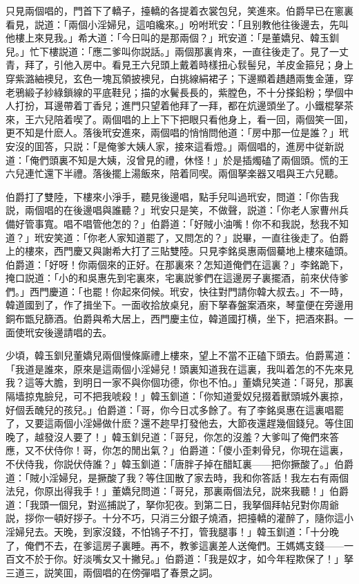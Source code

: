 只見兩個唱的，門首下了轎子，擡轎的各提着衣裳包兒，笑進來。伯爵早已在窻裏看見，説道：「兩個小淫婦兒，這咱纔來。」吩咐玳安：「且别教他往後邊去，先叫他樓上來見我。」希大道：「今日叫的是那兩個？」玳安道：「是董嬌兒、韓玉釧兒。」忙下樓説道：「應二爹叫你説話。」兩個那裏肯來，一直往後走了。見了一丈青，拜了，引他入房中。看見王六兒頭上戴着時樣扭心䯼髻兒，羊皮金箍兒；身上穿紫潞紬襖兒，玄色一塊瓦領披襖兒，白挑線絹裙子；下邊顯着趫趫兩隻金蓮，穿老鴉緞子紗綠鎖線的平底鞋兒；描的水鬢長長的，紫膛色，不十分搽鉛粉；學個中人打扮，耳邊帶着丁香兒；進門只望着他拜了一拜，都在炕邊頭坐了。小鐵棍拏茶來，王六兒陪着喫了。兩個唱的上上下下把眼只看他身上，看一回，兩個笑一囬，更不知是什麽人。落後玳安進來，兩個唱的悄悄問他道：「房中那一位是誰？」玳安沒的囬答，只説：「是俺爹大姨人家，接來這看燈。」兩個唱的，進房中従新説道：「俺們頭裏不知是大姨，沒曾見的禮，休怪！」於是插燭磕了兩個頭。慌的王六兒連忙還下半禮。落後擺上湯飯來，陪着同喫。兩個拏楽器又唱與王六兒聽。

伯爵打了雙陸，下樓來小淨手，聽見後邊唱，點手兒叫過玳安，問道：「你告我説，兩個唱的在後邊唱與誰聽？」玳安只是笑，不做聲，説道：「你老人家曹州兵備好管事寬。唱不唱管他怎的？」伯爵道：「好賊小油嘴！你不和我説，愁我不知道？」玳安笑道：「你老人家知道罷了，又問怎的？」説畢，一直往後走了。伯爵上的樓來，西門慶又與謝希大打了三貼雙陸。只見李銘吳惠兩個驀地上樓來磕頭。伯爵道：「好呀！你兩個來的正好。在那裏來？怎知道俺們在這裏？」李銘跪下，掩口説道：「小的和吳惠先到宅裏來，宅裏説爹們在這邊房子裏擺酒，前來伏侍爹們。」西門慶道：「也罷！你起來伺候。玳安，快往對門請你韓大叔去。」不一時，韓道國到了，作了揖坐下。一面收拾放桌兒，廚下拏春盤案酒來，琴童便在旁邊用銅布甑兒篩酒。伯爵與希大居上，西門慶主位，韓道國打横，坐下，把酒來斟。一面使玳安後邊請唱的去。

少頃，韓玉釧兒董嬌兒兩個慢條廝禮上樓來，望上不當不正磕下頭去。伯爵罵道：「我道是誰來，原來是這兩個小淫婦兒！頭裏知道我在這裏，我叫着怎的不先來見我？這等大膽，到明日一家不與你個功德，你也不怕。」董嬌兒笑道：「哥兒，那裏隔墙掠鬼臉兒，可不把我唬殺！」韓玉釧道：「你知道愛奴兒掇着獸頭城外裏掠，好個丢醜兒的孩兒。」伯爵道：「哥，你今日忒多餘了。有了李銘吳惠在這裏唱罷了，又要這兩個小淫婦做什麽？還不趂早打發他去，大節夜還趕幾個錢兒。等住囬晚了，越發沒人要了！」韓玉釧兒道：「哥兒，你怎的沒羞？大爹叫了俺們來答應，又不伏侍你！哥，你怎的閒出氣？」伯爵道：「儍小歪剌骨兒，你現在這裏，不伏侍我，你説伏侍誰？」韓玉釧道：「唐胖子掉在醋缸裏——把你撅酸了。」伯爵道：「賊小淫婦兒，是撅酸了我？等住囬散了家去時，我和你答話！我左右有兩個法兒，你原出得我手！」董嬌兒問道：「哥兒，那裏兩個法兒，説來我聽！」伯爵道：「我頭一個兒，對巡捕説了，拏你犯夜。到第二日，我拏個拜帖兒對你周爺説，拶你一頓好拶子。十分不巧，只消三分銀子燒酒，把擡轎的灌醉了，隨你這小淫婦兒去。天晚，到家沒錢，不怕鴇子不打，管我腿事！」韓玉釧道：「十分晚了，俺們不去，在爹這房子裏睡。再不，教爹這裏差人送俺們。王媽媽支錢——一百文不於于你。好淡嘴女又十撇兒。」伯爵道：「我是奴才，如今年程欺保了！」拏三道三，説笑囬，兩個唱的在傍彈唱了春景之詞。

